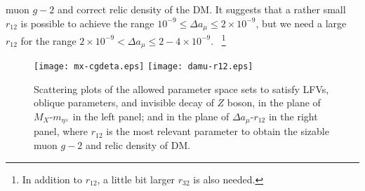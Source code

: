 \documentclass[%
showkeys,12pt,
preprint,preprintnumbers,nofootinbib,
groupedaddress,superscriptaddress,amsmath,amssymb]{revtex4}
\numberwithin{equation}{section}
\begin{document}
muon $g-2$ and correct relic density of the DM.
It suggests that a rather small $r_{12}$ is possible to achieve the range 
$10^{-9}\le \Delta a_\mu \le 2\times 10^{-9}$, but we need a large $r_{12}$ 
for the range $2\times10^{-9}< \Delta a_\mu \le 2 - 4\times 10^{-9}$.
~\footnote{In addition to $r_{12}$, a little bit larger $r_{32}$ is also needed.}
\begin{figure}[tb]
\begin{center}
\texttt{[image: mx-cgdeta.eps]}
\texttt{[image: damu-r12.eps]}
\caption{
Scattering {\it} plots of the allowed parameter space sets to satisfy LFVs, oblique parameters, and invisible decay of $Z$ boson,
in the plane of $M_X$-$m_{\eta^\pm}$ in the left
panel; and in the plane of $\Delta a_\mu$-$r_{12}$ in the right panel,
where $r_{12}$ is the most relevant parameter to obtain the sizable muon $g-2$ and relic density of DM.
}
\label{fig:nums-1}
\end{center}
\end{figure}
\end{document}
